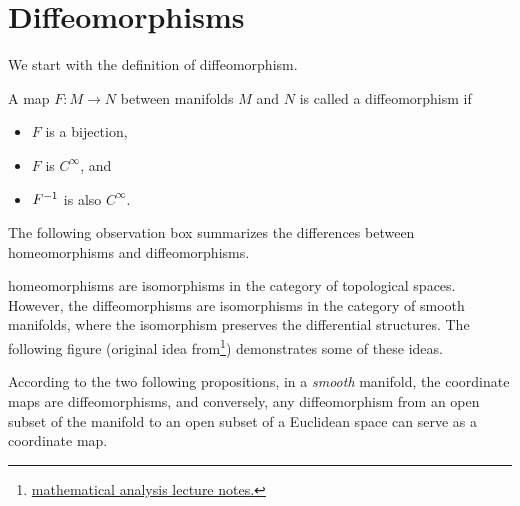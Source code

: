 \section{Diffeomorphisms}
We start with the definition of diffeomorphism.

\begin{proposition}
	A map $ F:M\to N $ between manifolds $ M $ and $ N $ is called a diffeomorphism if
	\begin{itemize}[nosep]
		\item $ F $ is a bijection,
		\item $ F $ is $ C^\infty $, and
		\item $ F^{-1} $ is also $ C^\infty $.
	\end{itemize}
\end{proposition}

The following observation box summarizes the differences between homeomorphisms and diffeomorphisms.

\begin{observation}
	homeomorphisms are isomorphisms in the category of topological spaces. However, the diffeomorphisms are isomorphisms in the category of smooth manifolds, where the isomorphism preserves the differential structures. The following figure (original idea from\footnote{\href{https://www.math.unipd.it/~maraston/An2Byaounde/An2BCam_1213_1_mfds.pdf}{ mathematical analysis lecture notes.}}) demonstrates some of these ideas.
\end{observation}
	
	
According to the two following propositions, in a \emph{smooth} manifold, the coordinate maps are diffeomorphisms, and conversely, any diffeomorphism from an open subset of the manifold to an open subset of a Euclidean space can serve as a coordinate map. 

